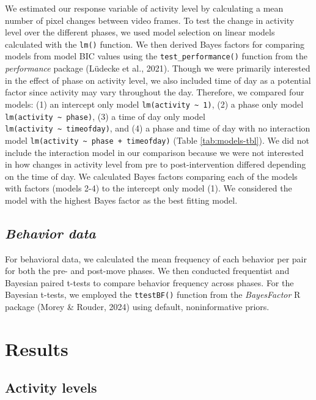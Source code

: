 \documentclass[
  pub]{apa6}
\begin{document}
We estimated our response variable of activity level by calculating a mean number of pixel changes between video frames. To test the change in activity level over the different phases, we used model selection on linear models calculated with the \texttt{lm()} function. We then derived Bayes factors for comparing models from model BIC values using the \texttt{test\_performance()} function from the \emph{performance} package (Lüdecke et al., 2021). Though we were primarily interested in the effect of phase on activity level, we also included time of day as a potential factor since activity may vary throughout the day. Therefore, we compared four models: (1) an intercept only model \texttt{lm(activity\ \textasciitilde{}\ 1)}, (2) a phase only model \texttt{lm(activity\ \textasciitilde{}\ phase)}, (3) a time of day only model \texttt{lm(activity\ \textasciitilde{}\ timeofday)}, and (4) a phase and time of day with no interaction model \texttt{lm(activity\ \textasciitilde{}\ phase\ +\ timeofday)} (Table \ref{tab:models-tbl}). We did not include the interaction model in our comparison because we were not interested in how changes in activity level from pre to post-intervention differed depending on the time of day. We calculated Bayes factors comparing each of the models with factors (models 2-4) to the intercept only model (1). We considered the model with the highest Bayes factor as the best fitting model.

\hypertarget{behavior-data}{%
\subsection{\texorpdfstring{\emph{Behavior data}}{Behavior data}}\label{behavior-data}}

For behavioral data, we calculated the mean frequency of each behavior per pair for both the pre- and post-move phases. We then conducted frequentist and Bayesian paired t-tests to compare behavior frequency across phases. For the Bayesian t-tests, we employed the \texttt{ttestBF()} function from the \emph{BayesFactor} R package (Morey \& Rouder, 2024) using default, noninformative priors.

\hypertarget{results}{%
\section{Results}\label{results}}

\hypertarget{activity-levels-2}{%
\subsection{Activity levels}\label{activity-levels-2}}
\end{document}

